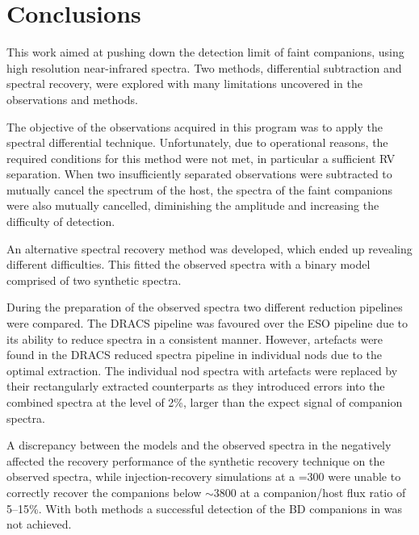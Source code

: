 
\chapter{Conclusions}  %
\label{cha:conclusions}

This work aimed at pushing down the detection limit of faint companions, using high resolution near-infrared spectra.
Two methods, differential subtraction and \textchisquared{} spectral recovery,  were explored with many limitations uncovered in the observations and methods.

The objective of the observations acquired in this program was to apply the spectral differential technique.
Unfortunately, due to operational reasons, the required conditions for this method were not met, in particular a sufficient {RV} separation.
When two insufficiently separated observations were subtracted to mutually cancel the spectrum of the host, the spectra of the faint companions were also mutually cancelled, diminishing the amplitude and increasing the difficulty of detection.

An alternative \textchisquared{} spectral recovery method was developed, which ended up revealing different difficulties.
This fitted the observed spectra with a binary model comprised of two synthetic spectra.

During the preparation of the observed spectra two different reduction pipelines were compared.
The {DRACS} pipeline was favoured over the {ESO} pipeline due to its ability to reduce spectra in a consistent manner.
However, artefacts were found in the {DRACS} reduced spectra pipeline in individual nods due to the optimal extraction.
The individual nod spectra with artefacts were replaced by their rectangularly extracted counterparts as they introduced errors into the combined spectra at the level of 2\%, larger than the expect signal of companion spectra.

A discrepancy between the models and the observed spectra in the \nir{} negatively affected the recovery performance of the synthetic recovery technique on the observed spectra, while injection-recovery simulations at a \snr{}=300 were unable to correctly recover the companions below \(\sim\)3800\K{} at a companion/host flux ratio of 5--15\%.
With both methods a successful detection of the {BD} companions in \nir{} was not achieved.

